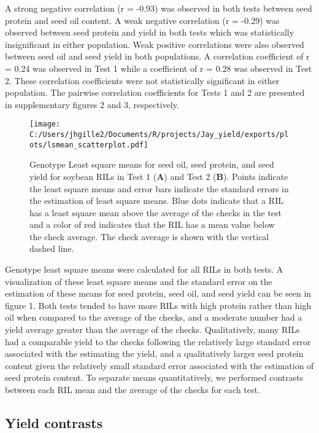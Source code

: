 \documentclass[Agronomy,article,submit,moreauthors,pdftex]{mdpi}
\begin{document}
A strong negative correlation (r = -0.93) was observed in both tests
between seed protein and seed oil content. A weak negative correlation
(r = -0.29) was observed between seed protein and yield in both tests
which was statistically insignificant in either population. Weak
positive correlations were also observed between seed oil and seed yield
in both populations. A correlation coefficient of r = 0.24 was observed
in Test 1 while a coefficient of r = 0.28 was observed in Test 2. These
correlation coefficients were not statistically significant in either
population. The pairwise correlation coefficients for Tests 1 and 2 are
presented in supplementary figures 2 and 3, respectively.

\begin{figure}[H]
\centering
\texttt{[image: C:/Users/jhgille2/Documents/R/projects/Jay\_yield/exports/plots/lsmean\_scatterplot.pdf]}
\caption{Genotype Least square means for seed oil, seed protein, and seed yield for soybean RILs in Test 1 (\textbf{A}) and Test 2 (\textbf{B}). Points indicate the least square means and error bars indicate the standard errors in the estimation of least square means. Blue dots indicate that a RIL has a least square mean above the average of the checks in the test and a color of red indicates that the RIL has a mean value below the check average. The check average is shown with the vertical dashed line.}
\end{figure}

Genotype least square means were calculated for all RILs in both tests.
A visualization of these least square means and the standard error on
the estimation of these means for seed protein, seed oil, and seed yield
can be seen in figure 1. Both tests tended to have more RILs with high
protein rather than high oil when compared to the average of the checks,
and a moderate number had a yield average greater than the average of
the checks. Qualitatively, many RILs had a comparable yield to the
checks following the relatively large standard error associated with the
estimating the yield, and a qualitatively larger seed protein content
given the relatively small standard error associated with the estimation
of seed protein content. To separate means quantitatively, we performed
contrasts between each RIL mean and the average of the checks for each
test.

\hypertarget{yield-contrasts}{%
\subsection{Yield contrasts}\label{yield-contrasts}}
\end{document}

